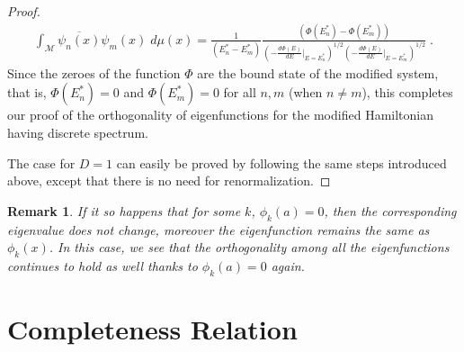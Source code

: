 \documentclass[amsmath,amssymb,14pt]{article}
\numberwithin{equation}{section}
\newtheorem{myremark}[mytheo]{Remark}
\begin{document}
\begin{proof}
%
\begin{eqnarray} \int_{\mathcal M} \overline{\psi_n(x)} \psi_m (x) \; d\mu( x) = \frac{1}{\left(E_{n}^* - E_{m}^* \right)} \frac{\left(\Phi(E_{n}^{*}) - \Phi(E_{m}^*)\right)}{\left(-\frac{d\Phi(E)}{d E}\bigg|_{E=E_{n}^{*}}\right)^{1/2} \left(-\frac{d \Phi(E)}{d E}\bigg|_{E=E_{m}^{*}}\right)^{1/2}} \;.
\end{eqnarray}
%
Since the zeroes of the function $\Phi$ are the bound state of the modified system, that is, $\Phi(E_{n}^{*})=0$ and $\Phi(E_{m}^{*})=0$ for all $n, m$ (when $n\neq m$), this completes our proof of the orthogonality of eigenfunctions for the modified  Hamiltonian having discrete spectrum.   


The case for $D=1$ can easily be proved by following the same steps introduced above, except that there is no need for renormalization. 
\end{proof}

\begin{myremark}
If it so happens that for some $k$, $\phi_k(a)=0$, then the corresponding eigenvalue does not change, moreover the eigenfunction remains the same as $\phi_k(x)$. In this case, we see that the orthogonality among all the eigenfunctions continues to hold as well thanks to $\phi_k(a)=0$ again.
\end{myremark}






\section{Completeness Relation}
\end{document}
